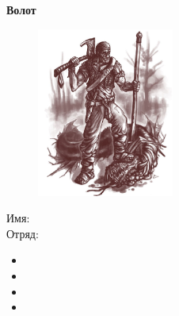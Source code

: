 \documentclass[10pt,twoside]{report}
\begin{document}
\thispagestyle{empty}
\begin{center}
{\LARGE \textbf{Волот}}

\begin{figure}[H]
  \includegraphics[width=170px]{images/volat.png}
\end{figure}

\end{center}
\begin{description}
\item[Имя:]\hfill
\item[Отряд:]\hfill
\end{description}
\pagebreak

{}
\begin{itemize}[noitemsep]
  \item 
  \item 
  \item 
  \item 
\end{itemize}
\pagebreak










\end{document}
